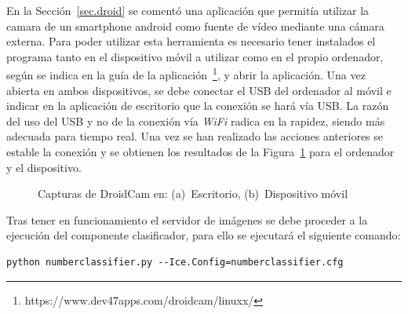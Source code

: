 En la Sección~\ref{sec.droid} se comentó una aplicación que permitía utilizar la camara de un smartphone android como fuente de vídeo mediante una cámara externa. Para poder utilizar esta herramienta es necesario tener instalados el programa tanto en el dispositivo móvil a utilizar como en el propio ordenador, según se indica en la guía de la aplicación~\footnote{https://www.dev47apps.com/droidcam/linuxx/}, y abrir la aplicación. Una vez abierta en ambos dispositivos, se debe conectar el USB del ordenador al móvil e indicar en la aplicación de escritorio que la conexión se hará vía USB. La razón del uso del USB y no de la conexión vía \textit{WiFi} radica en la rapidez, siendo más adecuada para tiempo real. Una vez se han realizado las acciones anteriores se estable la conexión y se obtienen los resultados de la Figura~\ref{fig.droid} para el ordenador y el dispositivo.

\begin{figure}[H]
	\centering
	 \hspace{10pt}
	\caption{Capturas de DroidCam en: (a)~Escritorio, (b)~Dispositivo móvil}
	\label{fig.droid}
\end{figure}

Tras tener en funcionamiento el servidor de imágenes se debe proceder a la ejecución del componente clasificador, para ello se ejecutará el siguiente comando:
\vspace{10pt}
\begin{lstlisting}[frame=single]
	python numberclassifier.py --Ice.Config=numberclassifier.cfg
\end{lstlisting}

